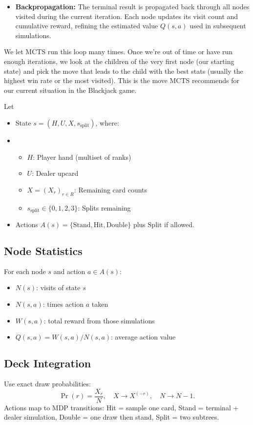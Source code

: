 \documentclass[12pt,a4paper]{cibb}
\begin{document}
\begin{itemize} 
    \item \textbf{Backpropagation:} The terminal result is propagated back through all nodes visited during the current iteration. Each node updates its visit count and cumulative reward, refining the estimated value $Q(s, a)$ used in subsequent simulations.
\end{itemize}

We let MCTS run this loop many times. Once we're out of time or have run enough iterations, we look at the children of the very first node (our starting state) and pick the move that leads to the child with the best stats (usually the highest win rate or the most visited). This is the move MCTS recommends for our current situation in the Blackjack game.

Let
\begin{itemize}
    \item State \(s=(H, U, X, s_{\mathrm{split}})\), where:
    \item \begin{itemize}[leftmargin=1.5cm]
\item \(H\): Player hand (multiset of ranks)
\item \(U\): Dealer up\-card
\item \(X=(X_r)_{r\in R}\): Remaining card counts
\item \(s_{\mathrm{split}}\in\{0,1,2,3\}\): Splits remaining
\end{itemize}
    \item Actions \(A(s)=\{\mathrm{Stand},\mathrm{Hit},\mathrm{Double}\}\) plus \(\mathrm{Split}\) if allowed.
\end{itemize}

\subsection{Node Statistics}
For each node \(s\) and action \(a\in A(s)\):
\begin{itemize}[leftmargin=1.5cm]
  \item \(N(s)\): visits of state \(s\)
  \item \(N(s,a)\): times action \(a\) taken
  \item \(W(s,a)\): total reward from those simulations
  \item \(Q(s,a)=W(s,a)/N(s,a)\): average action value
\end{itemize}

\subsection{{Deck Integration}}
Use exact draw probabilities:
\[\Pr(r)=\frac{X_r}{N},\quad X\to X^{(-r)},\quad N\to N-1.\]
Actions map to MDP transitions: Hit = sample one card, Stand = terminal + dealer simulation, Double = one draw then stand, Split = two subtrees.
\end{document}
